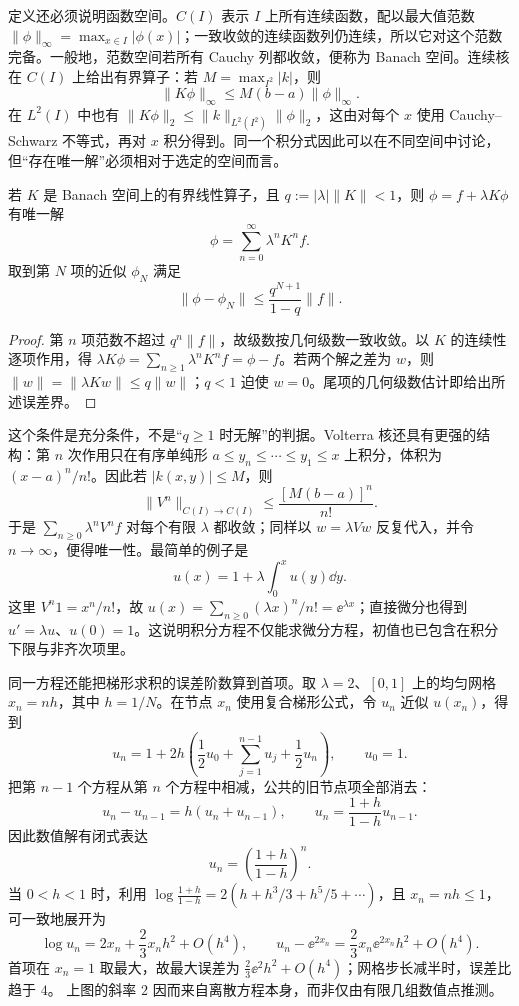 定义还必须说明函数空间。$C(I)$ 表示 $I$ 上所有连续函数，配以最大值范数 $\|\phi\|_\infty=\max_{x\in I}|\phi(x)|$；一致收敛的连续函数列仍连续，所以它对这个范数完备。一般地，范数空间若所有 Cauchy 列都收敛，便称为 Banach 空间。连续核在 $C(I)$ 上给出有界算子：若 $M=\max_{I^2}|k|$，则
\[
\|K\phi\|_\infty\le M(b-a)\|\phi\|_\infty.
\]
在 $L^2(I)$ 中也有 $\|K\phi\|_2\le\|k\|_{L^2(I^2)}\|\phi\|_2$，这由对每个 $x$ 使用 Cauchy--Schwarz 不等式，再对 $x$ 积分得到。同一个积分式因此可以在不同空间中讨论，但“存在唯一解”必须相对于选定的空间而言。

\begin{theorem}
若 $K$ 是 Banach 空间上的有界线性算子，且 $q:=|\lambda|\|K\|<1$，则 $\phi=f+\lambda K\phi$ 有唯一解
\begin{equation}
\phi=\sum_{n=0}^\infty\lambda^nK^nf.
\label{eq:advanced-fredholm-neumann}
\end{equation}
取到第 $N$ 项的近似 $\phi_N$ 满足
\[
\|\phi-\phi_N\|\le\frac{q^{N+1}}{1-q}\|f\|.
\]
\end{theorem}

\begin{proof}
第 $n$ 项范数不超过 $q^n\|f\|$，故级数按几何级数一致收敛。以 $K$ 的连续性逐项作用，得 $\lambda K\phi=\sum_{n\ge1}\lambda^nK^nf=\phi-f$。若两个解之差为 $w$，则 $\|w\|=\|\lambda Kw\|\le q\|w\|$；$q<1$ 迫使 $w=0$。尾项的几何级数估计即给出所述误差界。
\end{proof}

这个条件是充分条件，不是“$q\ge1$ 时无解”的判据。Volterra 核还具有更强的结构：第 $n$ 次作用只在有序单纯形 $a\le y_n\le\cdots\le y_1\le x$ 上积分，体积为 $(x-a)^n/n!$。因此若 $|k(x,y)|\le M$，则
\[
\|V^n\|_{C(I)\to C(I)}\le\frac{[M(b-a)]^n}{n!}.
\]
于是 $\sum_{n\ge0}\lambda^nV^nf$ 对每个有限 $\lambda$ 都收敛；同样以 $w=\lambda Vw$ 反复代入，并令 $n\to\infty$，便得唯一性。最简单的例子是
\[
u(x)=1+\lambda\int_0^x u(y)\dd y.
\]
这里 $V^n1=x^n/n!$，故 $u(x)=\sum_{n\ge0}(\lambda x)^n/n!=\ee^{\lambda x}$；直接微分也得到 $u'=\lambda u$、$u(0)=1$。这说明积分方程不仅能求微分方程，初值也已包含在积分下限与非齐次项里。

同一方程还能把梯形求积的误差阶数算到首项。取 $\lambda=2$、$[0,1]$ 上的均匀网格 $x_n=nh$，其中 $h=1/N$。在节点 $x_n$ 使用复合梯形公式，令 $u_n$ 近似 $u(x_n)$，得到
\[
u_n=1+2h\left(\frac12u_0+\sum_{j=1}^{n-1}u_j+\frac12u_n\right),
\qquad u_0=1.
\]
把第 $n-1$ 个方程从第 $n$ 个方程中相减，公共的旧节点项全部消去：
\[
u_n-u_{n-1}=h(u_n+u_{n-1}),
\qquad
u_n=\frac{1+h}{1-h}u_{n-1}.
\]
因此数值解有闭式表达
\[
u_n=\left(\frac{1+h}{1-h}\right)^n.
\]
当 $0<h<1$ 时，利用 $\log\frac{1+h}{1-h}=2(h+h^3/3+h^5/5+\cdots)$，且 $x_n=nh\le1$，可一致地展开为
\[
\log u_n=2x_n+\frac23x_nh^2+O(h^4),\qquad
u_n-\ee^{2x_n}=\frac23x_n\ee^{2x_n}h^2+O(h^4).
\]
首项在 $x_n=1$ 取最大，故最大误差为
$\frac23\ee^2h^2+O(h^4)$；网格步长减半时，误差比趋于 $4$。 上图的斜率 $2$ 因而来自离散方程本身，而非仅由有限几组数值点推测。

